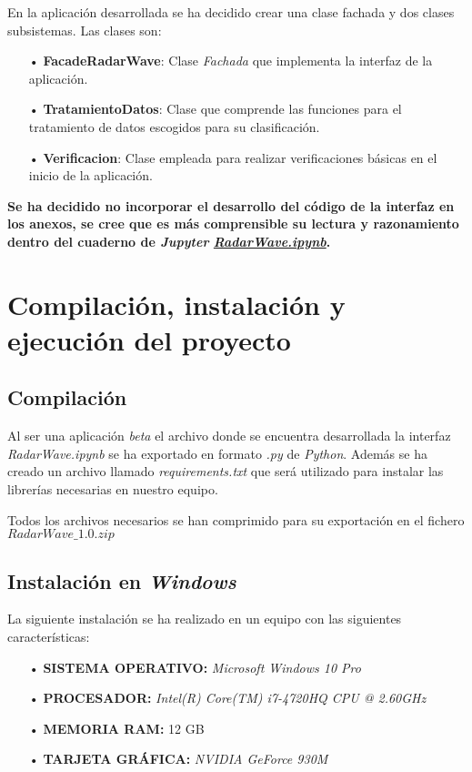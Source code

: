 En la aplicación desarrollada se ha decidido crear una clase fachada y dos clases subsistemas.
Las clases son:
\begin{itemize}
\item[•] \textbf{FacadeRadarWave}: Clase \textit{Fachada} que implementa la interfaz de la aplicación.
\item[•] \textbf{TratamientoDatos}: Clase que comprende las funciones para el tratamiento de datos escogidos para su clasificación.
\item[•] \textbf{Verificacion}: Clase empleada para realizar verificaciones básicas en el inicio de la aplicación.
\end{itemize}

\textbf{Se ha decidido no incorporar el desarrollo del código de la interfaz en los anexos, se cree que es más comprensible su lectura y razonamiento dentro del cuaderno de \textit{Jupyter} \href{https://github.com/mecyc/TFG_RADAR_60GHZ/blob/main/scripts/RadarWave.ipynb}{\textit{RadarWave.ipynb}}.}

\section{Compilación, instalación y ejecución del proyecto}
\subsection{Compilación}
Al ser una aplicación \textit{beta} el archivo donde se encuentra desarrollada la interfaz \textit{RadarWave.ipynb} se ha exportado en formato \textit{.py} de \textit{Python}. Además se ha creado un archivo llamado \textit{requirements.txt} que será utilizado para instalar las librerías necesarias en nuestro equipo.

Todos los archivos necesarios se han comprimido para su exportación en el fichero \textit{$RadarWave\_1.0.zip$}

\subsection{Instalación en \textit{Windows}}

La siguiente instalación se ha realizado en un equipo con las siguientes características:
\begin{itemize}
\item[•] \textbf{SISTEMA OPERATIVO:} \textit{Microsoft Windows 10 Pro}
\item[•] \textbf{PROCESADOR:} \textit{Intel(R) Core(TM) i7-4720HQ CPU @ 2.60GHz}
\item[•] \textbf{MEMORIA RAM:} 12 GB
\item[•] \textbf{TARJETA GRÁFICA:} \textit{NVIDIA GeForce 930M}
\end{itemize}

